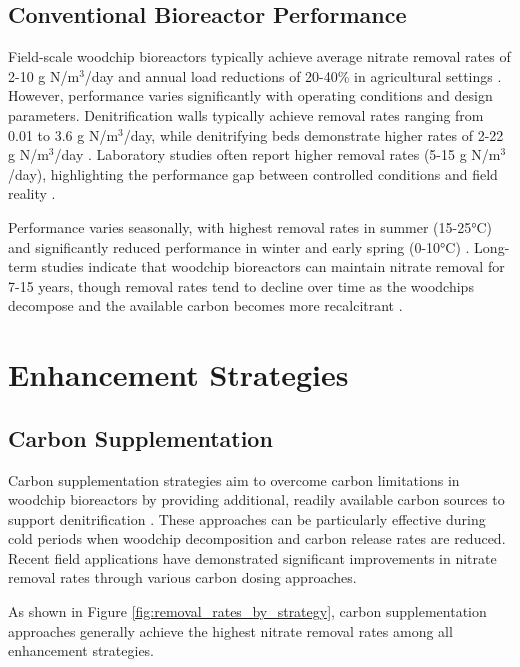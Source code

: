 \documentclass[12pt,a4paper]{article}
\begin{document}
\subsection{Conventional Bioreactor Performance}

Field-scale woodchip bioreactors typically achieve average nitrate removal rates of 2-10 g N/m$^3$/day and annual load reductions of 20-40\% in agricultural settings \citep{RN312, RN310}. However, performance varies significantly with operating conditions and design parameters. Denitrification walls typically achieve removal rates ranging from 0.01 to 3.6 g N/m$^3$/day, while denitrifying beds demonstrate higher rates of 2-22 g N/m$^3$/day \citep{RN625, RN629}. Laboratory studies often report higher removal rates (5-15 g N/m$^3$/day), highlighting the performance gap between controlled conditions and field reality \citep{RN611}.

Performance varies seasonally, with highest removal rates in summer (15-25°C) and significantly reduced performance in winter and early spring (0-10°C) \citep{RN214, RN228, RN258}. Long-term studies indicate that woodchip bioreactors can maintain nitrate removal for 7-15 years, though removal rates tend to decline over time as the woodchips decompose and the available carbon becomes more recalcitrant \citep{RN629, RN958}.

\section{Enhancement Strategies}

\subsection{Carbon Supplementation}

Carbon supplementation strategies aim to overcome carbon limitations in woodchip bioreactors by providing additional, readily available carbon sources to support denitrification \citep{RN635, RN632}. These approaches can be particularly effective during cold periods when woodchip decomposition and carbon release rates are reduced. Recent field applications have demonstrated significant improvements in nitrate removal rates through various carbon dosing approaches.

As shown in Figure \ref{fig:removal_rates_by_strategy}, carbon supplementation approaches generally achieve the highest nitrate removal rates among all enhancement strategies.
\end{document}
